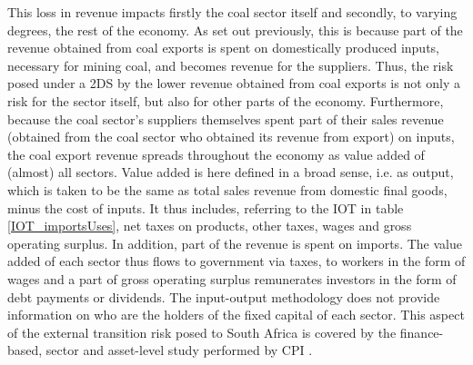 \documentclass[12pt,english]{article}
\begin{document}
This loss in revenue impacts firstly the coal sector itself and secondly, to varying degrees, the rest of the economy. As set out previously, this is because part of the revenue obtained from coal exports is spent on domestically produced inputs, necessary for mining coal, and becomes revenue for the suppliers. Thus, the risk posed under a 2DS by the lower revenue obtained from coal exports is not only a risk for the sector itself, but also for other parts of the economy. Furthermore, because the coal sector's suppliers themselves spent part of their sales revenue (obtained from the coal sector who obtained its revenue from export) on inputs, the coal export revenue spreads throughout the economy as value added of (almost) all sectors. Value added is here defined in a broad sense, i.e. as output, which is taken to be the same as total sales revenue from domestic final goods, minus the cost of inputs. It thus includes, referring to the IOT in table \ref{IOT_importsUses}, net taxes on products, other taxes, wages and gross operating surplus. In addition, part of the revenue is spent on imports. The value added of each sector thus flows to government via taxes, to workers in the form of wages and a part of gross operating surplus remunerates investors in the form of debt payments or dividends. 
The input-output methodology does not provide information on who are the holders of the fixed capital of each sector. This aspect of the external transition risk posed to South Africa is covered by the finance-based, sector and asset-level study performed by CPI \citep{CPI2019SA}. 
\end{document}

